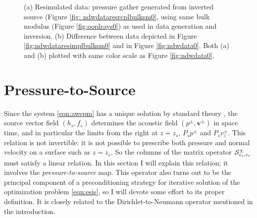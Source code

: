 \documentclass[georeport,12pt]{geophysics}
\newcommand{\bv}{\mathbf{v}}
\begin{document}
\begin{figure}
  \centering
  \caption{(a) Resimulated data: pressure gather generated from
    inverted source (Figure \ref{fig: ndwdataresrcplbulksm0}, using same
    bulk modulus (Figure \ref{fig:ooplrays0}) as used in data
    generation and inversion. (b) Difference
    between data depicted in Figure \ref{fig:ndwdataresimplbulksm0} and in Figure \ref{fig:ndwdata0}.
    Both (a) and (b) plotted with same color scale as Figure \ref{fig:ndwdata0}.}
\end{figure}

\section{Pressure-to-Source}

Since the system \ref{eqn:awepm} has a unique solution by standard
theory \cite[]{Lax:PDENotes}, the source vector field $(h_s,f_s)$
determines the acoustic field $(p^{\pm},\bv^{\pm})$ in space time, and
in particular the limits from the right at $z=z_s$, $P_sp^{\pm}$ and
$P_sv_z^{\pm}$. This relation is not invertible: it is not possible to
prescribe both pressure and normal velocity on a surface such as
$z=z_s$. So the columns of the matrix operator
${\cal S}^{\pm}_{z_s,z_r}$ must satisfy a linear relation. In this
section I will explain this relation; it involves the {\em
  pressure-to-source} map. This operator also turns out to be the
principal component of a preconditioning strategy for iterative
solution of the optimization problem \ref{eqn:esis}, so I will devote
some effort to its proper definition. It is closely related to the
Dirichlet-to-Neumann operator mentioned in the introduction.
\end{document}
